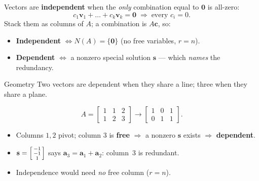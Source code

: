 \documentclass[aspectratio=169, 11pt]{beamer}
\newcommand{\vv}{\mathbf{v}}
\newcommand{\cc}{\mathbf{c}}
\newcommand{\svec}{\mathbf{s}}
\newcommand{\zero}{\mathbf{0}}
\begin{document}
\begin{frame}[t, plain]
  Vectors are \textbf{independent} when the \emph{only} combination equal to $\zero$ is all-zero:
  \[ c_1\vv_1+\dots+c_k\vv_k=\zero \;\Rightarrow\; \text{every } c_i=0. \]
  Stack them as columns of $A$; a combination is $A\cc$, so:
  \begin{itemize}
    \setlength{\itemsep}{5pt}
    \item \textbf{Independent} $\iff N(A)=\{\zero\}$ (no free variables, $r=n$).
    \item \textbf{Dependent} $\iff$ a nonzero special solution $\svec$ --- which \emph{names} the redundancy.
  \end{itemize}
  \vspace{2pt}
  \begin{block}{Geometry}
    Two vectors are dependent when they share a line; three when they share a plane.
  \end{block}
\end{frame}

\begin{frame}[t, plain]
  \[
    A=\begin{bmatrix} 1 & 1 & 2 \\ 1 & 2 & 3 \end{bmatrix}
    \longrightarrow
    \begin{bmatrix} 1 & 0 & 1 \\ 0 & 1 & 1 \end{bmatrix}.
  \]
  \begin{itemize}
    \setlength{\itemsep}{4pt}
    \item Columns $1,2$ pivot; column $3$ is \textbf{free} $\Rightarrow$ a nonzero $\svec$ exists $\Rightarrow$ \textbf{dependent}.
    \item $\svec=\begin{bsmallmatrix} -1\\-1\\1 \end{bsmallmatrix}$ says $\mathbf{a}_3=\mathbf{a}_1+\mathbf{a}_2$: column~3 is redundant.
    \item Independence would need \emph{no} free column ($r=n$).
  \end{itemize}
\end{frame}
\end{document}
